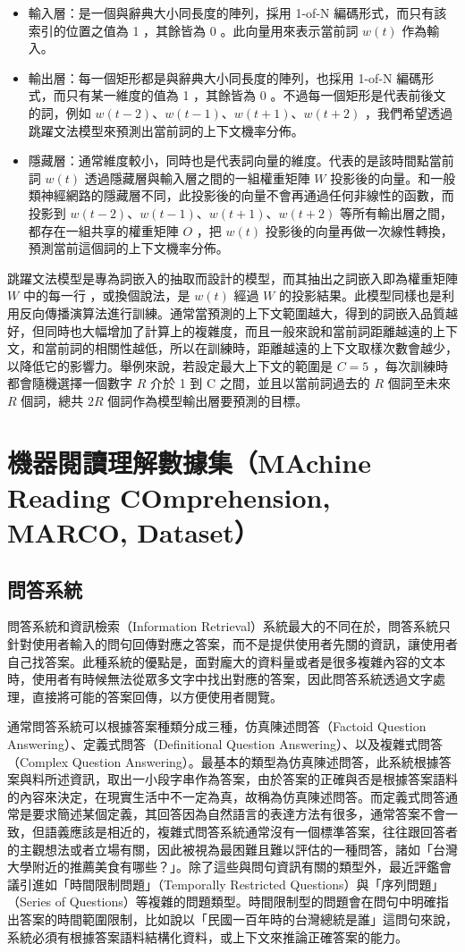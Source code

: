 \begin{itemize}
    \item 輸入層：是一個與辭典大小同長度的陣列，採用 1-of-N 編碼形式，而只有該索引的位置之值為 1 ，其餘皆為 0 。此向量用來表示當前詞 $w(t)$ 作為輸入。
    \item 輸出層：每一個矩形都是與辭典大小同長度的陣列，也採用 1-of-N 編碼形式，而只有某一維度的值為 1 ，其餘皆為 0 。不過每一個矩形是代表前後文的詞，例如 $w(t-2)$、$w(t-1)$、$w(t+1)$、$w(t+2)$ ，我們希望透過跳躍文法模型來預測出當前詞的上下文機率分佈。
    \item 隱藏層：通常維度較小，同時也是代表詞向量的維度。代表的是該時間點當前詞 $w(t)$ 透過隱藏層與輸入層之間的一組權重矩陣 $W$ 投影後的向量。和一般類神經網路的隱藏層不同，此投影後的向量不會再通過任何非線性的函數，而投影到 $w(t-2)$、$w(t-1)$、$w(t+1)$、$w(t+2)$ 等所有輸出層之間，都存在一組共享的權重矩陣 $O$ ，把 $w(t)$ 投影後的向量再做一次線性轉換，預測當前這個詞的上下文機率分佈。
\end{itemize}

跳躍文法模型是專為詞嵌入的抽取而設計的模型，而其抽出之詞嵌入即為權重矩陣 $W$ 中的每一行%
，或換個說法，是 $w(t)$ 經過 $W$ 的投影結果。此模型同樣也是利用反向傳播演算法進行訓練。通常當預測的上下文範圍越大，得到的詞嵌入品質越好，但同時也大幅增加了計算上的複雜度，而且一般來說和當前詞距離越遠的上下文，和當前詞的相關性越低，所以在訓練時，距離越遠的上下文取樣次數會越少，以降低它的影響力。舉例來說，若設定最大上下文的範圍是 $C=5$ ，每次訓練時都會隨機選擇一個數字 $R$ 介於 1 到 C 之間，並且以當前詞過去的 $R$ 個詞至未來 $R$ 個詞，總共 $2R$ 個詞作為模型輸出層要預測的目標。

\section{機器閱讀理解數據集（MAchine Reading COmprehension, MARCO, Dataset）}
\subsection{問答系統}
問答系統和資訊檢索（Information Retrieval）系統最大的不同在於，問答系統只針對使用者輸入的問句回傳對應之答案，而不是提供使用者先關的資訊，讓使用者自己找答案。此種系統的優點是，面對龐大的資料量或者是很多複雜內容的文本時，使用者有時候無法從眾多文字中找出對應的答案，因此問答系統透過文字處理，直接將可能的答案回傳，以方便使用者閱覽。

通常問答系統可以根據答案種類分成三種，仿真陳述問答（Factoid Question Answering）、定義式問答（Definitional Question Answering）、以及複雜式問答（Complex Question Answering）。最基本的類型為仿真陳述問答，此系統根據答案與料所述資訊，取出一小段字串作為答案，由於答案的正確與否是根據答案語料的內容來決定，在現實生活中不一定為真，故稱為仿真陳述問答。而定義式問答通常是要求簡述某個定義，其回答因為自然語言的表達方法有很多，通常答案不會一致，但語義應該是相近的，複雜式問答系統通常沒有一個標準答案，往往跟回答者的主觀想法或者立場有關，因此被視為最困難且難以評估的一種問答，諸如「台灣大學附近的推薦美食有哪些？」。除了這些與問句資訊有關的類型外，最近評鑑會議引進如「時間限制問題」（Temporally Restricted Questions）與「序列問題」（Series of Questions）等複雜的問題類型。時間限制型的問題會在問句中明確指出答案的時間範圍限制，比如說以「民國一百年時的台灣總統是誰」這問句來說，系統必須有根據答案語料結構化資料，或上下文來推論正確答案的能力。
